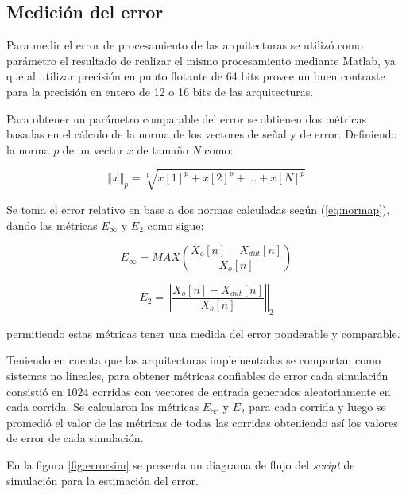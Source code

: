\subsection{Medición del error}

Para medir el error de procesamiento de las arquitecturas se utilizó como parámetro el resultado de
realizar el mismo procesamiento mediante Matlab, ya que al utilizar precisión en punto flotante de
64 bits provee un buen contraste para la precisión en entero de 12 o 16 bits de las arquitecturas.

Para obtener un parámetro comparable del error
se obtienen dos métricas basadas en el cálculo de la norma de los vectores de señal y de error.
Definiendo la norma $p$ de un vector $x$ de tamaño $N$ como:

\begin{equation}
\Vert\vec{x}\Vert_p = \sqrt[p]{x[1]^p+x[2]^p+\ldots+x[N]^p}
\label{eq:normap}
\end{equation}

Se toma el error relativo en base a dos normas calculadas según (\ref{eq:normap}), dando las
métricas $E_\infty$ y $E_2$ como sigue:

\begin{equation}
E_\infty = MAX\left(\frac{ X_o[n] - X_{dut}[n]}{X_o[n]}\right)
\label{eq:norma1}
\end{equation}

\begin{equation}
E_2 = \left\Vert\frac{X_o[n] - X_{dut}[n]}{X_o[n]}\right\Vert_2
\label{eq:norma2}
\end{equation}

permitiendo estas métricas tener una medida del error ponderable y comparable.

Teniendo en cuenta que las arquitecturas implementadas se comportan como sistemas no lineales, para
obtener métricas confiables de error cada simulación consistió en $1024$ corridas con vectores de
entrada generados aleatoriamente en cada corrida. Se calcularon las métricas $E_\infty$ y $E_2$ para
cada corrida y luego se promedió el valor de las métricas de todas las corridas obteniendo así los
valores de error de cada simulación.

En la figura \ref{fig:errorsim} se presenta un diagrama de flujo del \textit{script} de simulación para la
estimación del error. 

